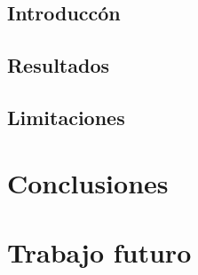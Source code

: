 \documentclass{article}
\begin{document}
\subsection{Introducc\'on}
\subsection{Resultados}
\subsection{Limitaciones}

\newpage
\section{Conclusiones}

\section{Trabajo futuro}

\end{document}
